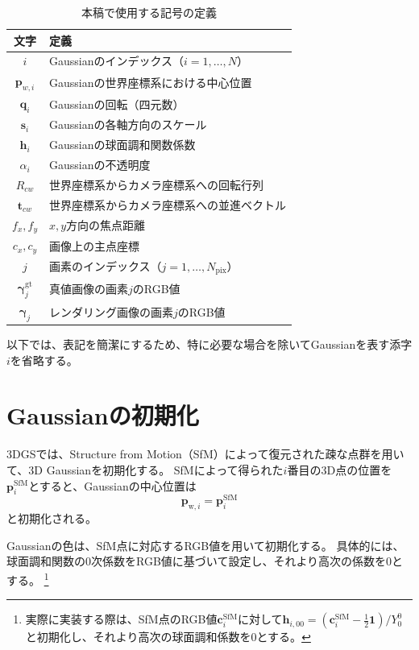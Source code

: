 \documentclass[dvipdfmx]{jlreq}
\begin{document}
\begin{table}[H]
    \centering
    \begin{tabular}{|c|l|}\hline
        文字 & 定義 \\ \hline
        $i$ & Gaussianのインデックス（$i = 1,\ldots,N$） \\
        $\bm{p}_{w,i}$ & Gaussianの世界座標系における中心位置 \\
        $\bm{q}_i$ & Gaussianの回転（四元数） \\
        $\bm{s}_i$ & Gaussianの各軸方向のスケール \\
        $\bm{h}_i$ & Gaussianの球面調和関数係数 \\
        $\alpha_i$ & Gaussianの不透明度 \\ \hline
        $R_{cw}$ & 世界座標系からカメラ座標系への回転行列 \\
        $\bm{t}_{cw}$ & 世界座標系からカメラ座標系への並進ベクトル \\
        $f_x,f_y$ & $x,y$方向の焦点距離 \\
        $c_x,c_y$ & 画像上の主点座標 \\ \hline
        $j$ & 画素のインデックス（$j = 1,\ldots,N_{\mathrm{pix}}$） \\
        $\bm{\gamma}_j^{\mathrm{gt}}$ & 真値画像の画素$j$のRGB値 \\
        $\bm{\gamma}_j$ & レンダリング画像の画素$j$のRGB値 \\ \hline
    \end{tabular}
    \caption{本稿で使用する記号の定義}
    \label{tab:symbol_definitions}
\end{table}

以下では、表記を簡潔にするため、特に必要な場合を除いてGaussianを表す添字$i$を省略する。

\section{Gaussianの初期化}
3DGSでは、Structure from Motion（SfM）によって復元された疎な点群を用いて、3D Gaussianを初期化する。
SfMによって得られた$i$番目の3D点の位置を$\bm{p}^{\mathrm{SfM}}_i$とすると、Gaussianの中心位置は
\begin{equation}
    \bm{p}_{\mathrm{w},i} = \bm{p}^{\mathrm{SfM}}_i
\end{equation}
と初期化される。

Gaussianの色は、SfM点に対応するRGB値を用いて初期化する。
具体的には、球面調和関数の0次係数をRGB値に基づいて設定し、それより高次の係数を0とする。
\footnote{実際に実装する際は、SfM点のRGB値$\bm{c}_i^{\mathrm{SfM}}$に対して$\bm{h}_{i,00} = (\bm{c}_i^{\mathrm{SfM}}-\frac{1}{2}\bm{1})/Y_0^0$と初期化し、それより高次の球面調和係数を$0$とする。}
\end{document}
